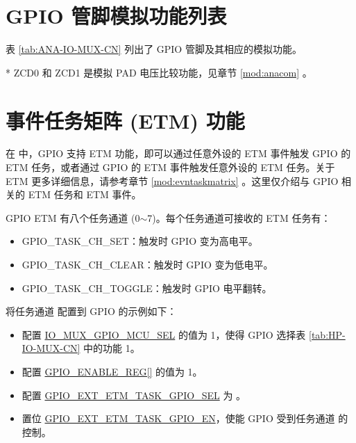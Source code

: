 \documentclass[main\_\_CN.tex]{subfiles}
\begin{document}
\section{GPIO 管脚模拟功能列表}
\label{sec:analog_pins}
表 \ref{tab:ANA-IO-MUX-CN} 列出了 GPIO 管脚及其相应的模拟功能。


\tableheaderAnalogFunctionsCN
\tablecontentAnalogFunctions

* ZCD0 和 ZCD1 是模拟 PAD 电压比较功能，见章节 \ref{mod:anacom} \textit{}。

\section{事件任务矩阵 (ETM) 功能}

在  \chipname{} 中，GPIO 支持 ETM 功能，即可以通过任意外设的 ETM 事件触发 GPIO 的 ETM 任务，或者通过 GPIO 的 ETM 事件触发任意外设的 ETM 任务。关于 ETM 更多详细信息，请参考章节 \ref{mod:evntaskmatrix} \textit{}。这里仅介绍与 GPIO 相关的 ETM 任务和 ETM 事件。

GPIO ETM 有八个任务通道  (0$\sim$7)。每个任务通道可接收的 ETM 任务有：

\begin{itemize}
    \item GPIO\_TASK\_CH\_SET：触发时 GPIO 变为高电平。
    \item GPIO\_TASK\_CH\_CLEAR：触发时 GPIO 变为低电平。
    \item GPIO\_TASK\_CH\_TOGGLE：触发时 GPIO 电平翻转。
\end{itemize}

将任务通道  配置到 GPIO 的示例如下：

\begin{itemize}
    \item 配置 \hyperref[fielddesc:IOMUXGPIONMCUSEL]{IO\_MUX\_GPIO\_MCU\_SEL} 的值为 1，使得 GPIO 选择表 \ref{tab:HP-IO-MUX-CN} 中的功能 1。
    \item 配置 \hyperref[regdesc:GPIOENABLEREG]{GPIO\_ENABLE\_REG[]} 的值为 1。
    \item 配置 \hyperref[fielddesc:GPIOEXTETMTASKGPIO0SEL]{GPIO\_EXT\_ETM\_TASK\_GPIO\_SEL} 为 。
    \item 置位 \hyperref[fielddesc:GPIOEXTETMTASKGPIO0EN]{GPIO\_EXT\_ETM\_TASK\_GPIO\_EN}，使能 GPIO 受到任务通道  的控制。
\end{itemize}
\end{document}
